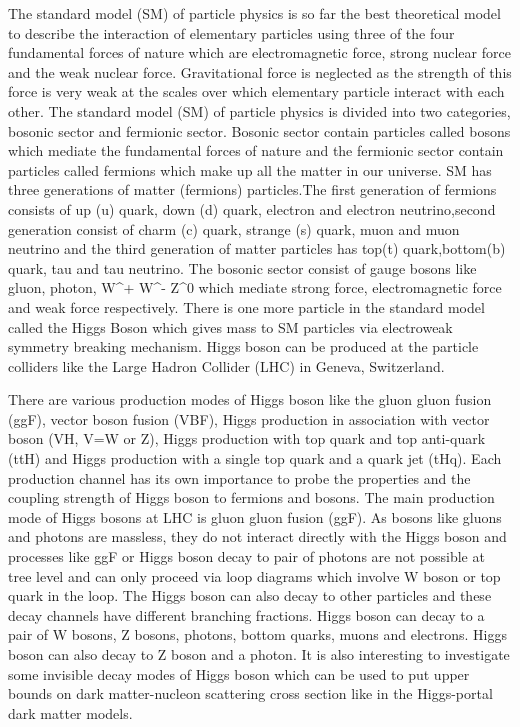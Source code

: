 \documentclass[final,3p]{CSP}
\begin{document}
The standard model (SM) of particle physics is so far the best theoretical model to describe the interaction of elementary 
particles using three of the four fundamental forces of nature which are electromagnetic force, strong nuclear force and the weak
nuclear force. Gravitational force is neglected as the strength of this force is very weak at the scales over which elementary 
particle interact with each other. The standard model (SM) of particle physics is divided into two categories, bosonic sector 
and fermionic sector. Bosonic sector contain particles called bosons which mediate the fundamental forces of nature and the
fermionic sector contain particles called fermions which make up all the matter in our universe. SM has three generations of 
matter (fermions) particles.The first generation of fermions consists of up (u) quark, down (d) quark, electron and electron 
neutrino,second generation consist of charm (c) quark, strange (s) quark, muon and muon neutrino and the third generation of matter 
particles has top(t) quark,bottom(b) quark, tau and tau neutrino. The bosonic sector consist of gauge bosons like gluon, photon, 
W^+ W^- Z^0 which mediate strong force, electromagnetic force and weak force respectively. There is one more particle in the 
standard model called the Higgs Boson which gives mass to SM particles via electroweak symmetry breaking mechanism. Higgs boson 
can be produced at the particle colliders like the Large Hadron Collider (LHC) in Geneva, Switzerland. 

There are various production modes of Higgs boson like the gluon gluon fusion (ggF), vector boson fusion (VBF), Higgs production 
in association with vector boson (VH, V=W or Z), Higgs production with top quark and top anti-quark (ttH) and Higgs production with 
a single top quark and a quark jet (tHq). Each production channel has its own importance to probe the properties and the coupling 
strength of Higgs boson to fermions and bosons. The main production mode of Higgs bosons at LHC is gluon gluon fusion (ggF). As 
bosons like gluons and photons are massless, they do not interact directly with the Higgs boson and processes like ggF or Higgs 
boson decay to pair of photons are not possible at tree level and can only proceed via loop diagrams which involve W boson or top 
quark in the loop. The Higgs boson can also decay to other particles and these decay channels have different branching fractions. 
Higgs boson can decay to a pair of W bosons, Z bosons, photons, bottom quarks, muons and electrons. Higgs boson can also decay to 
Z boson and a photon. It is also interesting to investigate some invisible decay modes of Higgs boson which can be used to put 
upper bounds on dark matter-nucleon scattering cross section like in the Higgs-portal dark matter models. 
\end{document}
